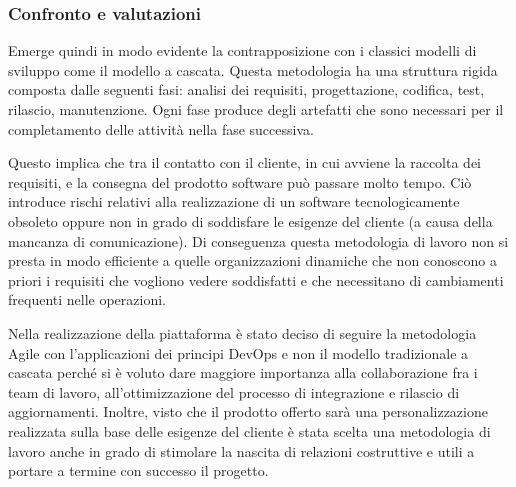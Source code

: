\subsubsection{Confronto e valutazioni}
Emerge quindi in modo evidente la contrapposizione con i classici modelli di sviluppo come il modello a cascata.
Questa metodologia ha una struttura rigida composta dalle seguenti fasi: analisi dei requisiti, progettazione, codifica, test, rilascio, manutenzione.
Ogni fase produce degli artefatti che sono necessari per il completamento delle attività nella fase successiva.

Questo implica che tra il contatto con il cliente, in cui avviene la raccolta dei requisiti, e la consegna del prodotto software può passare molto tempo.
Ciò introduce rischi relativi alla realizzazione di un software tecnologicamente obsoleto oppure non in grado di soddisfare le
esigenze del cliente (a causa della mancanza di comunicazione).
Di conseguenza questa metodologia di lavoro non si presta in modo efficiente a quelle organizzazioni dinamiche che non conoscono
a priori i requisiti che vogliono vedere soddisfatti e che necessitano di cambiamenti frequenti nelle operazioni.

Nella realizzazione della piattaforma è stato deciso di seguire la metodologia Agile con l'applicazioni dei principi DevOps e non il modello tradizionale a cascata
perché si è voluto dare maggiore importanza alla collaborazione fra i team di lavoro, all'ottimizzazione del processo di integrazione e rilascio di aggiornamenti.
Inoltre, visto che il prodotto offerto sarà una personalizzazione realizzata sulla base delle esigenze del cliente
è stata scelta una metodologia di lavoro anche in grado di stimolare la nascita di relazioni costruttive e utili a portare a termine con successo il progetto.



